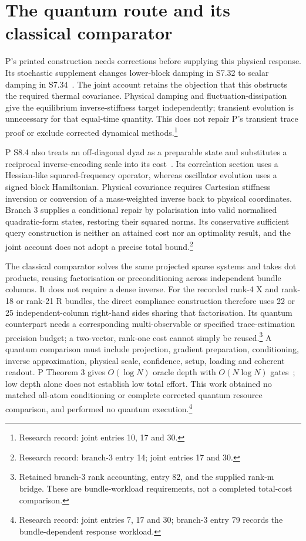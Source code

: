 \documentclass{article}
\begin{document}
\section{The quantum route and its classical comparator}
P's printed construction needs corrections before supplying this physical response. Its stochastic supplement changes lower-block damping in S7.32 to scalar damping in S7.34~\cite{P}. The joint account retains the objection that this obstructs the required thermal covariance. Physical damping and fluctuation-dissipation give the equilibrium inverse-stiffness target independently; transient evolution is unnecessary for that equal-time quantity. This does not repair P's transient trace proof or exclude corrected dynamical methods.\footnote{Research record: joint entries 10, 17 and 30.}

P S8.4 also treats an off-diagonal dyad as a preparable state and substitutes a reciprocal inverse-encoding scale into its cost~\cite{P}. Its correlation section uses a Hessian-like squared-frequency operator, whereas oscillator evolution uses a signed block Hamiltonian. Physical covariance requires Cartesian stiffness inversion or conversion of a mass-weighted inverse back to physical coordinates. Branch 3 supplies a conditional repair by polarisation into valid normalised quadratic-form states, restoring their squared norms. Its conservative sufficient query construction is neither an attained cost nor an optimality result, and the joint account does not adopt a precise total bound.\footnote{Research record: branch-3 entry 14; joint entries 17 and 30.}

The classical comparator solves the same projected sparse systems and takes dot products, reusing factorisation or preconditioning across independent bundle columns. It does not require a dense inverse. For the recorded rank-4 X and rank-18 or rank-21 R bundles, the direct compliance construction therefore uses 22 or 25 independent-column right-hand sides sharing that factorisation. Its quantum counterpart needs a corresponding multi-observable or specified trace-estimation precision budget; a two-vector, rank-one cost cannot simply be reused.\footnote{Retained branch-3 rank accounting, entry 82, and the supplied rank-m bridge. These are bundle-workload requirements, not a completed total-cost comparison.} A quantum comparison must include projection, gradient preparation, conditioning, inverse approximation, physical scale, confidence, setup, loading and coherent readout. P Theorem 3 gives \(O(\log N)\) oracle depth with \(O(N\log N)\) gates~\cite{P}; low depth alone does not establish low total effort. This work obtained no matched all-atom conditioning or complete corrected quantum resource comparison, and performed no quantum execution.\footnote{Research record: joint entries 7, 17 and 30; branch-3 entry 79 records the bundle-dependent response workload.}
\end{document}
